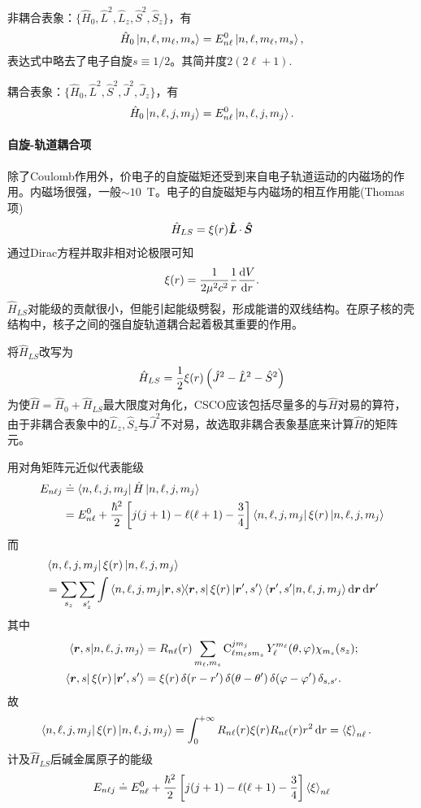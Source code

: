 非耦合表象：$\{\hat H_0,\hat L^2,\hat L_z,\hat S^2,\hat S_z\}$，有 %
\[
	\hat H_0\ket{n,\ell,m_\ell,m_s}=E_{n\ell}^0\ket{n,\ell,m_\ell,m_s},
\]
表达式中略去了电子自旋$s\equiv 1/2$。其简并度$2(2\ell+1)$.

耦合表象：$\{\hat H_0,\hat L^2,\hat S^2,\hat J^2,\hat J_z\}$，有 
\[
	\hat H_0\ket{n,\ell,j,m_j}=E_{n\ell}^0\ket{n,\ell,j,m_j}.
\]
\paragraph*{自旋-轨道耦合项}
除了Coulomb作用外，价电子的自旋磁矩还受到来自电子轨道运动的内磁场的作用。内磁场很强，一般$\sim10$~T。电子的自旋磁矩与内磁场的相互作用能(Thomas项)
\begin{align}
	\hat H_{LS}=\xi(r)\qo L\cdot\,\qo S%
\end{align}
通过Dirac方程并取非相对论极限可知
\[
	\xi(r)=\frac1{2\mu^2c^2}\frac1r\dv{V}r.
\]
$\hat H_{LS}$对能级的贡献很小，但能引起能级劈裂，形成能谱的双线结构。在原子核的壳结构中，核子之间的强自旋轨道耦合起着极其重要的作用。

将$\hat H_{LS}$改写为
\[
	\hat H_{LS}=\frac12\xi(r)\kh{\hat J^2-\hat L^2-\hat S^2}
\]
为使$\hat H=\hat H_0+\hat H_{LS}$最大限度对角化，CSCO应该包括尽量多的与$\hat H$对易的算符，由于非耦合表象中的$\hat L_z,\hat S_z$与$\hat J^2$不对易，故选取非耦合表象基底来计算$\hat H$的矩阵元。

用对角矩阵元近似代表能级
\begin{align*}
	E_{n\ell j}&\doteq\bra{n,\ell,j,m_j}\hat H\ket{n,\ell,j,m_j}\\
	&=E_{n\ell}^0+\frac{\hbar^2}2\fkh{j(j+1)-\ell(\ell+1)-\frac34}\bra{n,\ell,j,m_j}\xi(r)\ket{n,\ell,j,m_j}
\end{align*}
而
\begin{align*}
	&\bra{n,\ell,j,m_j}\xi(r)\ket{n,\ell,j,m_j}\\
	&=\sum_{s_z}\sum_{s_z'}\int\brkt{n,\ell,j,m_j}{\r,s}\bs3\bra{\r,s}\xi(r)\ket{\r',s'}\brkt{\r',s'}{n,\ell,j,m_j}\d\bm r\d\bm r'
\end{align*}
其中 
\begin{align*}
	\brkt{\r,s}{n,\ell,j,m_j}&=R_{n\ell}(r)\sum_{m_\ell,m_s}\Cle_{\ell m_\ell sm_s}^{jm_j}Y_\ell^{m_\ell}(\theta,\varphi)\chi_{m_s}(s_z);\\
	\bra{\r,s}\xi(r)\ket{\r',s'}&=\xi(r)\vd(r-r')\vd(\theta-\theta')\vd(\varphi-\varphi')\vd_{s,s'}.
\end{align*}
故
\begin{align*}
	\bra{n,\ell,j,m_j}\xi(r)\ket{n,\ell,j,m_j}&=\int\zti R_{n\ell}(r)\xi(r)R_{n\ell}(r)r^2\d r%
	=\ave\xi_{n\ell}.
\end{align*}
计及$\hat H_{LS}$后碱金属原子的能级
\[
E_{n\ell j}\doteq E_{n\ell}^0+\frac{\hbar^2}2\fkh{j(j+1)-\ell(\ell+1)-\frac34}\ave\xi_{n\ell}
\]

